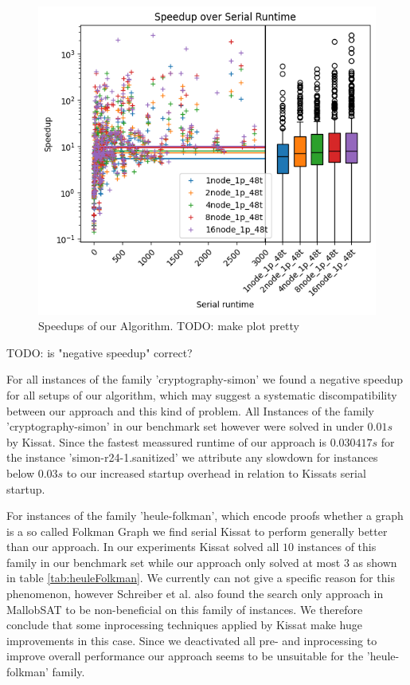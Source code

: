 \documentclass[12pt,a4paper,twoside]{scrartcl}
\numberwithin{equation}{section}
\begin{document}
\begin{figure}
  \center
  \includegraphics{plots/speedups_gim.png}
  \caption{Speedups of our Algorithm. TODO: make plot pretty}
  \label{fig:speedups}
\end{figure}


TODO: is "negative speedup" correct?

For all instances of the family 'cryptography-simon' we found a negative speedup for all setups of our algorithm, which may suggest a systematic discompatibility between our approach and this kind of problem. All Instances of the family 'cryptography-simon' in our benchmark set however were solved in under $0.01s$ by Kissat. Since the fastest meassured runtime of our approach is $0.030417s$ for the instance 'simon-r24-1.sanitized' we attribute any slowdown for instances below $0.03s$ to our increased startup overhead in relation to Kissats serial startup.

For instances of the family 'heule-folkman', which encode proofs whether a graph is a so called Folkman Graph \cite{satCompetition} we find serial Kissat to perform generally better than our approach. In our experiments Kissat solved all $10$ instances of this family in our benchmark set while our approach only solved at most $3$ as shown in table \ref{tab:heuleFolkman}. We currently can not give a specific reason for this phenomenon, however Schreiber et al. \cite{searchOnlyPaper} also found the search only approach in MallobSAT to be non-beneficial on this family of instances. We therefore conclude that some inprocessing techniques applied by Kissat make huge improvements in this case. Since we deactivated all pre- and inprocessing to improve overall performance our approach seems to be unsuitable for the 'heule-folkman' family.
\end{document}
